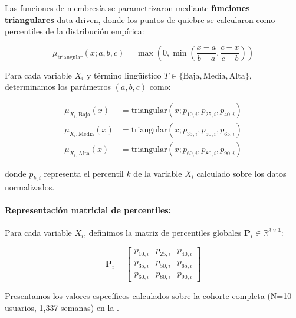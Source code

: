 Las funciones de membresía se parametrizaron mediante \textbf{funciones triangulares} data-driven, donde los puntos de quiebre se calcularon como percentiles de la distribución empírica:

\begin{equation}
\mu_{\text{triangular}}(x; a, b, c) = \max\left(0, \min\left(\frac{x - a}{b - a}, \frac{c - x}{c - b}\right)\right)
\label{eq:func_triangular}
\end{equation}

Para cada variable \(X_i\) y término lingüístico \(T \in \{\text{Baja}, \text{Media}, \text{Alta}\}\), determinamos los parámetros \((a, b, c)\) como:

\begin{align}
\mu_{X_i, \text{Baja}}(x) &= \text{triangular}(x; p_{10,i}, p_{25,i}, p_{40,i}) \label{eq:mf_baja} \\
\mu_{X_i, \text{Media}}(x) &= \text{triangular}(x; p_{35,i}, p_{50,i}, p_{65,i}) \label{eq:mf_media} \\
\mu_{X_i, \text{Alta}}(x) &= \text{triangular}(x; p_{60,i}, p_{80,i}, p_{90,i}) \label{eq:mf_alta}
\end{align}

donde \(p_{k,i}\) representa el percentil \(k\) de la variable \(X_i\) calculado sobre los datos normalizados.

\paragraph{Representación matricial de percentiles:}

Para cada variable \(X_i\), definimos la matriz de percentiles globales \(\mathbf{P}_i \in \mathbb{R}^{3 \times 3}\):

\begin{equation}
\mathbf{P}_i = \begin{bmatrix}
p_{10,i} & p_{25,i} & p_{40,i} \\
p_{35,i} & p_{50,i} & p_{65,i} \\
p_{60,i} & p_{80,i} & p_{90,i}
\end{bmatrix}
\label{eq:matriz_percentiles}
\end{equation}

Presentamos los valores específicos calculados sobre la cohorte completa (N=10 usuarios, 1,337 semanas) en la .


